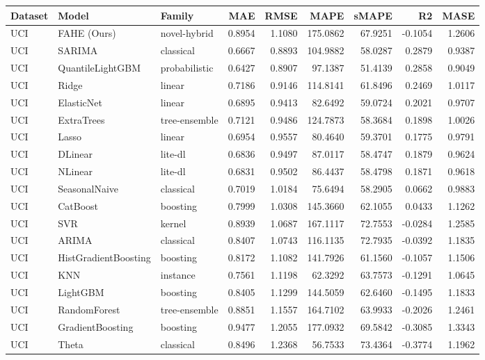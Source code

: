\begin{tabular}{lllrrrrrr}
\toprule
Dataset & Model & Family & MAE & RMSE & MAPE & sMAPE & R2 & MASE \\
\midrule
UCI & FAHE (Ours) & novel-hybrid & 0.8954 & 1.1080 & 175.0862 & 67.9251 & -0.1054 & 1.2606 \\
UCI & SARIMA & classical & 0.6667 & 0.8893 & 104.9882 & 58.0287 & 0.2879 & 0.9387 \\
UCI & QuantileLightGBM & probabilistic & 0.6427 & 0.8907 & 97.1387 & 51.4139 & 0.2858 & 0.9049 \\
UCI & Ridge & linear & 0.7186 & 0.9146 & 114.8141 & 61.8496 & 0.2469 & 1.0117 \\
UCI & ElasticNet & linear & 0.6895 & 0.9413 & 82.6492 & 59.0724 & 0.2021 & 0.9707 \\
UCI & ExtraTrees & tree-ensemble & 0.7121 & 0.9486 & 124.7873 & 58.3684 & 0.1898 & 1.0026 \\
UCI & Lasso & linear & 0.6954 & 0.9557 & 80.4640 & 59.3701 & 0.1775 & 0.9791 \\
UCI & DLinear & lite-dl & 0.6836 & 0.9497 & 87.0117 & 58.4747 & 0.1879 & 0.9624 \\
UCI & NLinear & lite-dl & 0.6831 & 0.9502 & 86.4437 & 58.4798 & 0.1871 & 0.9618 \\
UCI & SeasonalNaive & classical & 0.7019 & 1.0184 & 75.6494 & 58.2905 & 0.0662 & 0.9883 \\
UCI & CatBoost & boosting & 0.7999 & 1.0308 & 145.3660 & 62.1055 & 0.0433 & 1.1262 \\
UCI & SVR & kernel & 0.8939 & 1.0687 & 167.1117 & 72.7553 & -0.0284 & 1.2585 \\
UCI & ARIMA & classical & 0.8407 & 1.0743 & 116.1135 & 72.7935 & -0.0392 & 1.1835 \\
UCI & HistGradientBoosting & boosting & 0.8172 & 1.1082 & 141.7926 & 61.1560 & -0.1057 & 1.1506 \\
UCI & KNN & instance & 0.7561 & 1.1198 & 62.3292 & 63.7573 & -0.1291 & 1.0645 \\
UCI & LightGBM & boosting & 0.8405 & 1.1299 & 144.5059 & 62.6460 & -0.1495 & 1.1833 \\
UCI & RandomForest & tree-ensemble & 0.8851 & 1.1557 & 164.7102 & 63.9933 & -0.2026 & 1.2461 \\
UCI & GradientBoosting & boosting & 0.9477 & 1.2055 & 177.0932 & 69.5842 & -0.3085 & 1.3343 \\
UCI & Theta & classical & 0.8496 & 1.2368 & 56.7533 & 73.4364 & -0.3774 & 1.1962 \\

\end{tabular}

